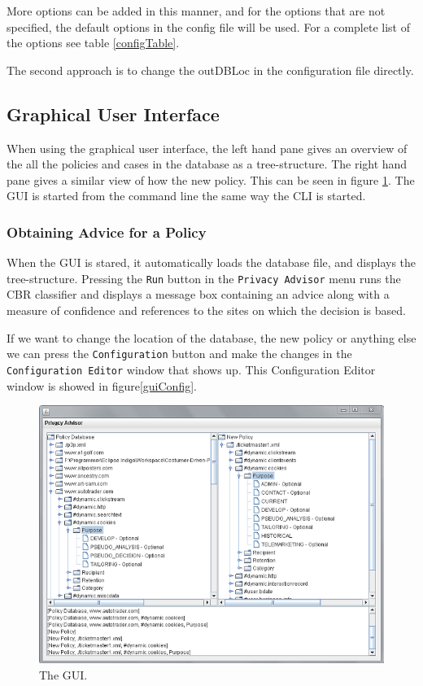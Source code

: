 
More options can be added in this manner, and for the options that are not specified, the default options in the config file will be used. For a complete list of the options see table \ref{configTable}.

The second approach is to change the outDBLoc in the configuration file directly.

\subsection{Graphical User Interface}
When using the graphical user interface, the left hand pane gives an overview of the all the policies and cases in the database as a tree-structure. The right hand pane gives a similar view of how the new policy. This can be seen in figure \ref{guiFigure}. The GUI is started from the command line the same way the CLI is started.

\subsubsection{Obtaining Advice for a Policy}
When the GUI is stared, it automatically loads the database file, and displays the tree-structure. Pressing the \texttt{Run} button in the \texttt{Privacy Advisor} menu runs the CBR classifier and displays a message box containing an advice along with a measure of confidence and references to the sites on which the decision is based.


If we want to change the location of the database, the new policy or anything else we can press the \texttt{Configuration} button and make the changes in the \texttt{Configuration Editor} window that shows up. This Configuration Editor window is showed in figure\ref{guiConfig}.

 \begin{figure}[h!]
     \includegraphics[width = .6\textwidth]{Documentation/gui.png}
     \caption{The GUI.}
   \label{guiFigure}
 \end{figure}

